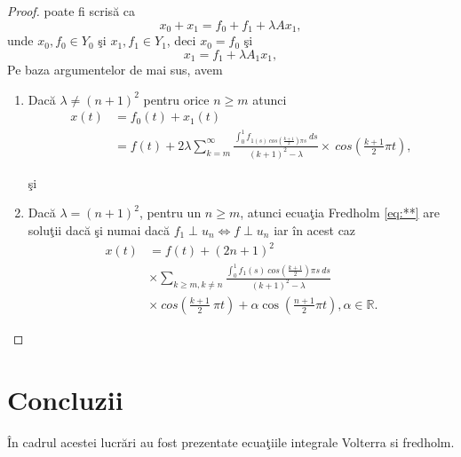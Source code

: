 \documentclass[a4paper,12pt,oneside]{report}
\begin{document}
\begin{proof}
\noindent poate fi scris\u{a} ca
\begin{displaymath}
  x_{0} + x_{1} = f_{0} + f_{1} + \lambda Ax_{1},
\end{displaymath}
unde \(x_{0} ,f_{0} \in Y_{0}\) \c{s}i \(x_{1} ,f_{1} \in Y_{1}\), deci \(x_{0} = f_{0}\)  \c{s}i
\begin{displaymath}
  x_{1} = f_{1} + \lambda A_{1}x_{1}, \label{eq:**} \tag{**}
\end{displaymath}
Pe baza argumentelor de mai sus, avem
\begin{enumerate}
    \item Dac\u{a} \(\lambda \neq \left ( n+1 \right )^{2}\) pentru orice \(n\geq m\) atunci
\begin{equation} \nonumber
    \begin{split}
       x\left ( t \right ) &   = f_{0}\left ( t \right ) + x_{1}\left ( t \right )  \\ &
        = f\left ( t \right ) + 2 \lambda \sum_{k=m}^{\infty }\frac{\int_{0}^{1}f_{1\left ( s \right ) \ cos\left ( \frac{k+1}{2} \right )\pi s }\ ds}{\left ( k+1 \right )^{2} - \lambda }\times \ cos \left ( \frac{k+1}{2}\pi t \right ),
    \end{split}
\end{equation}

 \c{s}i
 \item Dac\u{a} \(\lambda = \left ( n+1 \right )^{2}\), pentru un \(n\geq m\), atunci ecua\c{t}ia Fredholm \ref{eq:**} are solu\c{t}ii dac\u{a} \c{s}i numai dac\u{a} \(f_{1} \perp u_{n} \Leftrightarrow f \perp u_{n}\) iar \^{i}n acest caz
 \begin{equation} \nonumber
     \begin{split}
         x\left ( t \right ) &    = f\left ( t \right ) + \left ( 2n+1 \right )^{2} \\ &
         \times \sum_{k\geq m,k\neq n}\frac{\int_{0}^{1}f_{1}\left ( s \right ) \ cos \left ( \frac{k+1}{2} \right ) \pi s \ ds}{\left ( k+1 \right )^{2} - \lambda } \\ &
          \times  \ cos \left ( \frac{k+1}{2}\ \pi t  \right ) + \alpha  \cos \left ( \frac{n+1}{2} \pi t \right ), \alpha \in \mathbb{R}.
     \end{split}
 \end{equation}


\end{enumerate}

\end{proof}
\chapter* {Concluzii}
\^{I}n cadrul acestei lucr\u{a}ri au fost prezentate ecua\c{t}iile integrale Volterra si fredholm. 
\end{document}
